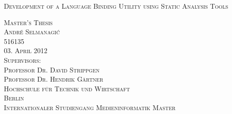 \thispagestyle{empty}


\begin{center}

\vspace*{2cm}
\Large
\textsc{Development of a Language Binding Utility using Static Analysis Tools}\\

\vspace{3cm}

\textsc{Master's Thesis\\[0.5\baselineskip]
André Selmanagi\'{c}\\
516135}\\


\vspace{3cm}
\textsc{03. April 2012}\\

\vspace{1cm}
\textsc{Supervisors:\\
Professor Dr. David Strippgen\\
Professor Dr. Hendrik Gärtner}\\

\vspace{1cm}
\textsc{Hochschule für Technik und Wirtschaft\\
Berlin\\
Internationaler Studiengang Medieninformatik Master}

\end{center}

\addtocounter{page}{-1}
